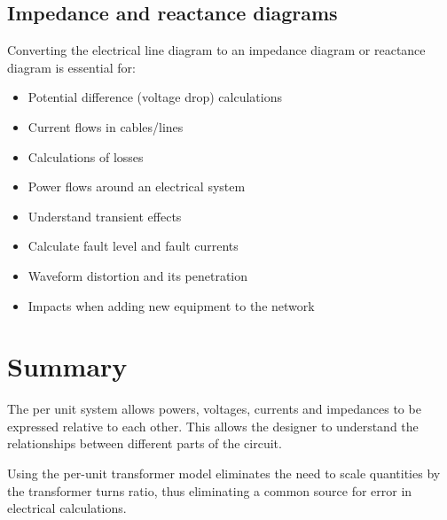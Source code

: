 \subsection{Impedance and reactance diagrams}
Converting the electrical line diagram to an impedance diagram or reactance diagram is essential for:
\begin{itemize}
	\item Potential difference (voltage drop) calculations
	\item Current flows in cables/lines
	\item Calculations of losses
	\item Power flows around an electrical system
	\item Understand transient effects
	\item Calculate fault level and fault currents
	\item Waveform distortion and its penetration
	\item Impacts when adding new equipment to the network
\end{itemize}
\section{Summary}
The per unit system allows powers, voltages, currents and impedances to be expressed relative to each other. This allows the designer to understand the relationships between different parts of the circuit.

Using the per-unit transformer model eliminates the need to scale quantities by the transformer turns ratio, thus eliminating a common source for error in electrical calculations.













